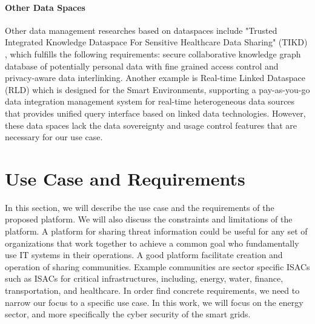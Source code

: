 \documentclass{article}
\begin{document}
\paragraph{Other Data Spaces}
Other data management researches based on dataspaces include "Trusted Integrated Knowledge Dataspace For Sensitive Healthcare Data Sharing" (TIKD)  \cite{hernandez_tikd_2021}, which fulfills the following requirements: secure collaborative knowledge graph database of potentially personal data with fine grained access control and privacy-aware data interlinking.
Another example is Real-time Linked Dataspace (RLD) \cite{curry_real-time_2019} which is designed for the Smart Environments, supporting a pay-as-you-go data integration management system for real-time heterogeneous data sources that provides unified query interface based on linked data technologies.
However, these data spaces lack the data sovereignty and usage control features that are necessary for our use case.



\section{Use Case and Requirements} %
\label{sec:use-case}




In this section, we will describe the use case and the requirements of the proposed platform. We will also discuss the constraints and limitations of the platform. A platform for sharing threat information could be useful for any set of organizations that work together to achieve a common goal who fundamentally use IT systems in their operations. A good platform facilitate creation and operation of sharing communities. Example communities are sector specific ISACs such as ISACs for critical infrastructures, including, energy, water, finance, transportation, and healthcare. In order find concrete requirements, we need to narrow our focus to a specific use case. In this work, we will focus on the energy sector, and more specifically the cyber security of the smart grids.
\end{document}
